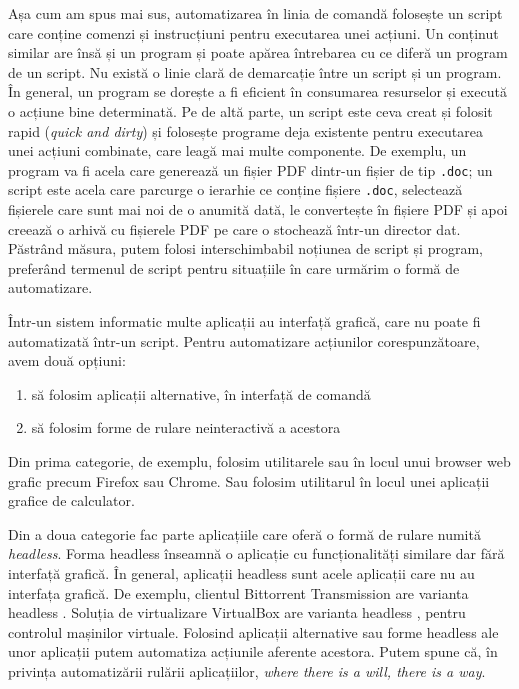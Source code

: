 Așa cum am spus mai sus, automatizarea în linia de comandă folosește un script care conține comenzi și instrucțiuni pentru executarea unei acțiuni.
Un conținut similar are însă și un program și poate apărea întrebarea cu ce diferă un program de un script.
Nu există o linie clară de demarcație între un script și un program.
În general, un program se dorește a fi eficient în consumarea resurselor și execută o acțiune bine determinată.
Pe de altă parte, un script este ceva creat și folosit rapid (\textit{quick and dirty}) și folosește programe deja existente pentru executarea unei acțiuni combinate, care leagă mai multe componente.
De exemplu, un program va fi acela care generează un fișier PDF dintr-un fișier de tip \texttt{.doc}; un script este acela care parcurge o ierarhie ce conține fișiere \texttt{.doc}, selectează fișierele care sunt mai noi de o anumită dată, le convertește în fișiere PDF și apoi creează o arhivă cu fișierele PDF pe care o stochează într-un director dat.
Păstrând măsura, putem folosi interschimbabil noțiunea de script și program, preferând termenul de script pentru situațiile în care urmărim o formă de automatizare.

Într-un sistem informatic multe aplicații au interfață grafică, care nu poate fi automatizată într-un script.
Pentru automatizare acțiunilor corespunzătoare, avem două opțiuni:
\begin{enumerate}
  \item să folosim aplicații alternative, în interfață de comandă
  \item să folosim forme de rulare neinteractivă a acestora
\end{enumerate}

Din prima categorie, de exemplu, folosim utilitarele  sau  în locul unui browser web grafic precum Firefox sau Chrome.
Sau folosim utilitarul  în locul unei aplicații grafice de calculator.

Din a doua categorie fac parte aplicațiile care oferă o formă de rulare numită \textit{headless}.
Forma headless înseamnă o aplicație cu funcționalități similare dar fără interfață grafică.
În general, aplicații headless sunt acele aplicații care nu au interfața grafică.
De exemplu, clientul Bittorrent Transmission are varianta headless .
Soluția de virtualizare VirtualBox are varianta headless , pentru controlul mașinilor virtuale.
Folosind aplicații alternative sau forme headless ale unor aplicații putem automatiza acțiunile aferente acestora.
Putem spune că, în privința automatizării rulării aplicațiilor, \textit{where there is a will, there is a way}.

